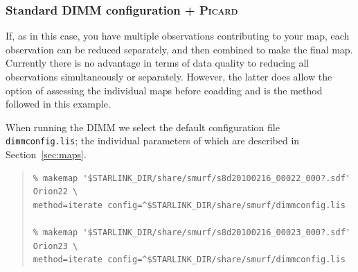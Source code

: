 \documentclass[twoside,11pt]{article}
\newcommand{\xref}[3]{#1}
\newcommand{\xlabel}[1]{}
\renewcommand{\_}{\texttt{\symbol{95}}}
\newenvironment{myquote}{\begin{quote}\begin{small}}{\end{small}\end{quote}}
\newcommand{\picard}{\xref{\textsc{Picard}}{sun231}{}}
\begin{document}
\subsubsection{\xlabel{galacticpicard}Standard DIMM configuration + \picard}

If, as in this case, you have multiple observations contributing to
your map, each observation can be reduced separately, and then
combined to make the final map. Currently there is no advantage in
terms of data quality to reducing all observations simultaneously or
separately. However, the latter does allow the option of assessing the
individual maps before coadding and is the method followed in this
example.

When running the DIMM we select the default configuration file
\texttt{dimmconfig.lis}; the individual parameters of which are
described in Section~\ref{sec:maps}.

\begin{myquote}
\begin{verbatim}
% makemap '$STARLINK_DIR/share/smurf/s8d20100216_00022_000?.sdf' Orion22 \
method=iterate config=^$STARLINK_DIR/share/smurf/dimmconfig.lis

% makemap '$STARLINK_DIR/share/smurf/s8d20100216_00023_000?.sdf' Orion23 \
method=iterate config=^$STARLINK_DIR/share/smurf/dimmconfig.lis
\end{verbatim}
\end{myquote}
\end{document}
